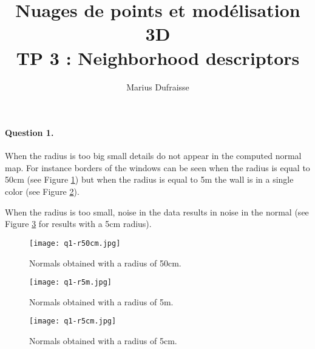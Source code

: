 \documentclass[french]{article}
\begin{document}
\title{Nuages de points et modélisation 3D\\
TP 3 : Neighborhood descriptors}
\author{Marius Dufraisse}
\date{}

\maketitle


\paragraph{Question 1.} When the radius is too big small details do not appear in the computed normal map. For instance borders of the windows can be seen when the radius is equal to 50cm (see Figure \ref{fig:q1-50cm}) but when the radius is equal to 5m the wall is in a single color (see Figure \ref{fig:q1-5m}).

When the radius is too small, noise in the data results in noise in the normal (see Figure \ref{fig:q1-5cm} for results with a 5cm radius).



\begin{figure}[h]
	\centering
	\texttt{[image: q1-r50cm.jpg]}
	\caption{Normals obtained with a radius of 50cm.}
	\label{fig:q1-50cm}
\end{figure}

\begin{figure}[h]
	\centering
	\texttt{[image: q1-r5m.jpg]}
	\caption{Normals obtained with a radius of 5m.}
	\label{fig:q1-5m}
\end{figure}

\begin{figure}[h]
	\centering
	\texttt{[image: q1-r5cm.jpg]}
	\caption{Normals obtained with a radius of 5cm.}
	\label{fig:q1-5cm}
\end{figure}
\end{document}
